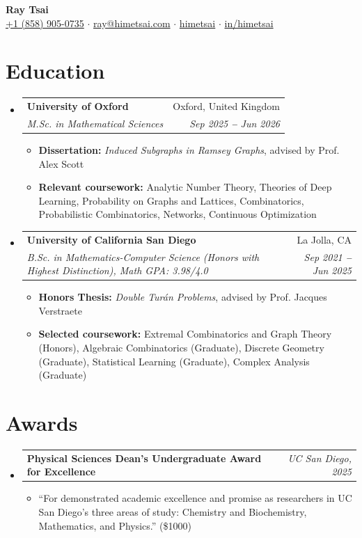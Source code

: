 \documentclass[letterpaper,11pt]{article}
\makeatletter
\newcommand{\resumeItem}[1]{
  \item\small{
    {#1 \vspace{-1pt}}
  }
}
\newcommand{\resumeSubSubheading}[2]{
  \vspace{-2pt}\item
    \begin{tabular*}{0.97\textwidth}{l@{\extracolsep{\fill}}r}
      \textbf{\small#1} & \textit{\small #2} \\
    \end{tabular*}\vspace{-5pt}
}
\newcommand{\resumeEducationHeading}[4]{
  \vspace{-2pt}\item
    \begin{tabular*}{0.97\textwidth}[t]{l@{\extracolsep{\fill}}r}
      \textbf{#1} & #2 \\
      \textit{\small#3} & \textit{\small #4} \\
    \end{tabular*}\vspace{-5pt}
}
\newcommand{\resumeSubHeadingListStart}{\begin{itemize}[leftmargin=0.15in, label={}]}
\newcommand{\resumeSubHeadingListEnd}{\end{itemize}}
\newcommand{\resumeItemListStart}{\begin{itemize}\vspace{-2pt}}
\newcommand{\resumeItemListEnd}{\end{itemize}\vspace{-7pt}}
\makeatother
\begin{document}

\begin{center}
  \textbf{\Huge Ray Tsai} \\
  \vspace{8pt}
  \small
  \faMobile \hspace{.5pt} \href{tel:18589050735}{+1 (858) 905-0735}
  $\cdot$
  \faAt \hspace{.5pt} \href{mailto:ray@himetsai.com}{ray@himetsai.com}
  $\cdot$
  \faGithub \hspace{.5pt} \href{https://github.com/himetsai}{himetsai}
  $\cdot$
  \faLinkedinSquare \hspace{.5pt} \href{https://www.linkedin.com/in/himetsai}{in/himetsai}
\end{center}


\section{Education}
\resumeSubHeadingListStart
  \resumeEducationHeading{University of Oxford}{Oxford, United Kingdom}{M.Sc. in Mathematical Sciences}{Sep 2025 \textbf{--} Jun 2026}
  \resumeItemListStart
    \resumeItem{\textbf{Dissertation:} \textit{Induced Subgraphs in Ramsey Graphs}, advised by Prof. Alex Scott}
    \resumeItem{\textbf{Relevant coursework:}
    Analytic Number Theory, Theories of Deep Learning, Probability on Graphs and Lattices, Combinatorics, Probabilistic Combinatorics, Networks, Continuous Optimization}
  \resumeItemListEnd

  \vspace{3pt}

  \resumeEducationHeading{University of California San Diego}{La Jolla, CA}{B.Sc. in Mathematics-Computer Science (Honors with Highest Distinction), Math GPA: 3.98/4.0}{Sep 2021 \textbf{--} Jun 2025}
  \resumeItemListStart
    \resumeItem{\textbf{Honors Thesis:} \textit{Double Tur\'{a}n Problems}, advised by Prof. Jacques Verstraete}
    \resumeItem{\textbf{Selected coursework:} Extremal Combinatorics and Graph Theory (Honors), Algebraic Combinatorics (Graduate), Discrete Geometry (Graduate), Statistical Learning (Graduate), Complex Analysis (Graduate)}
  \resumeItemListEnd
\resumeSubHeadingListEnd


\section{Awards}
\resumeSubHeadingListStart
  \resumeSubSubheading{Physical Sciences Dean's Undergraduate Award for Excellence}{UC San Diego, 2025}
  \resumeItemListStart
    \resumeItem{``For demonstrated academic excellence and promise as researchers in UC San Diego's three areas of study: Chemistry and Biochemistry, Mathematics, and Physics.'' (\$1000)}
  \resumeItemListEnd
\resumeSubHeadingListEnd
\end{document}
